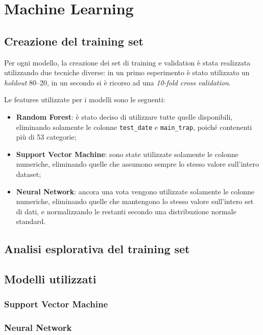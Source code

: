 \setcounter{chapter}{0}
\part{Machine Learning}
\chapter{Creazione del training set}
Per ogni modello, la creazione dei set di training e validation è stata 
realizzata utilizzando due tecniche diverse: in un primo esperimento è stato 
utilizzato un \textit{holdout} 80--20, in un secondo si è ricorso ad una 
\textit{10-fold cross validation}.

Le features utilizzate per i modelli sono le seguenti:
\begin{itemize}
	\item \textbf{Random Forest}: è stato deciso di utilizzare tutte quelle 
	disponibili, eliminando solamente le colonne \texttt{test\_date} e 
	\texttt{main\_trap}, poiché contenenti più di 53 categorie;
	\item \textbf{Support Vector Machine}: sono state utilizzate solamente le 
	colonne numeriche, eliminando quelle che assumono sempre lo stesso 
	valore sull'intero dataset;
	\item \textbf{Neural Network}: ancora una vota vengono utilizzate solamente 
	le colonne numeriche, eliminando quelle che mantengono lo stesso valore 
	sull'intero set di dati, e	normalizzando le restanti secondo una 
	distribuzione normale standard.
\end{itemize} 

\chapter{Analisi esplorativa del training set}

\chapter{Modelli utilizzati}


\section{Support Vector Machine}

\section{Neural Network}

